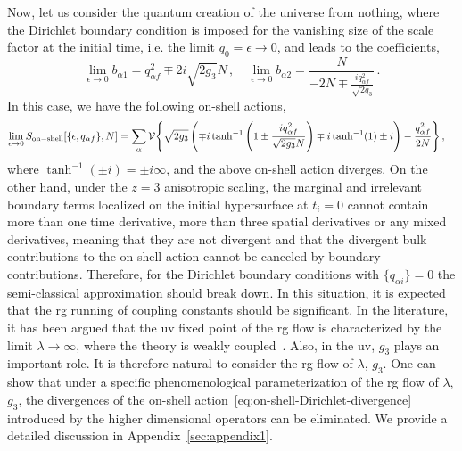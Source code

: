 \documentclass[superscriptaddress,aps,preprintnumbers,nofootinbib]{revtex4-2}
\begin{document}
Now, let us consider the quantum creation of the universe from nothing, where the Dirichlet boundary condition is imposed for the vanishing size of the scale factor at the initial time, i.e. the limit $q_0=\epsilon\to 0$, and leads to the coefficients,
\begin{equation}
\lim_{\epsilon \to 0} b_{\alpha 1}=q_{\alpha f}^2\mp 2 i\sqrt{2g_{3}} N\,,
\quad \lim_{\epsilon \to 0}
b_{\alpha 2}=\frac{N}{-2 N\mp \frac{iq_{\alpha f}^2}{\sqrt{2g_{3}}}}\,.
\end{equation}
In this case, we have the following on-shell actions,
\begin{align}\label{eq:on-shell-Dirichlet-divergence}
\lim_{\epsilon \to 0} S_{\rm on-shell}[\{\epsilon,q_{\alpha f}\}, N]&=
\sum_{\alpha}{\cal V}\Biggl\{
\sqrt{2g_{3}} \left(\mp i \tanh^{-1}\left(1\pm \frac{i q_{\alpha f}^2}{\sqrt{2g_{3}} N}\right)
\mp i\tanh^{-1}(1)\pm i\right) -\frac{q_{\alpha f}^2}{2 N}\Biggr\}\,,
\end{align}
where $\tanh^{-1}(\pm i)=\pm i\infty$, and the above on-shell action diverges. On the other hand, under the $z=3$ anisotropic scaling, the marginal and irrelevant boundary terms localized on the initial hypersurface at $t_{i}=0$ cannot contain more than one time derivative, more than three spatial derivatives or any mixed derivatives, meaning that they are not divergent and that the divergent bulk contributions to the on-shell action cannot be canceled by boundary contributions. Therefore, for the Dirichlet boundary conditions with $\{q_{\alpha i}\}=0$ the semi-classical approximation should break down. In this situation, it is expected that the \ac{rg} running of coupling constants should be significant. In the literature, it has been argued that the \ac{uv} fixed point of the \ac{rg} flow is characterized by the limit $\lambda \to \infty $, where the theory is weakly coupled~\cite{Gumrukcuoglu:2011xg,Radkovski:2023cew}. Also, in the \ac{uv}, $g_3$ plays an important role. It is therefore natural to consider the \ac{rg} flow of $\lambda$, $g_{3}$. One can show that under a specific phenomenological parameterization of the \ac{rg} flow of $\lambda$, $g_{3}$, the divergences of the on-shell action~\eqref{eq:on-shell-Dirichlet-divergence} introduced by the higher dimensional operators can be eliminated. We provide a detailed discussion in Appendix~\ref{sec:appendix1}.
\end{document}
